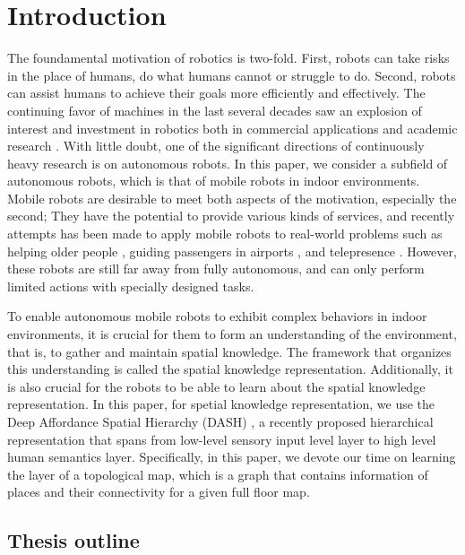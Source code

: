 \documentclass[10pt, titlepage]{article}
\theoremstyle{definition}
\begin{document}
\section{Introduction}
The foundamental motivation of robotics is two-fold. First, robots can take risks in the place of humans, do what humans cannot or struggle to do. Second, robots can assist humans to achieve their goals more efficiently and effectively. The continuing favor of machines in the last several decades saw an explosion of interest and investment in robotics both in commercial applications and academic research \cite{pagliarini2017future}. With little doubt, one of the significant directions of continuously heavy research is on autonomous robots. In this paper, we consider a subfield of autonomous robots, which is that of mobile robots in indoor environments. Mobile robots are desirable to meet both aspects of the motivation, especially the second; They have the potential to provide various kinds of services, and recently attempts has been made to apply mobile robots to real-world problems such as helping older people \cite{jayawardena2010deployment}, guiding passengers in airports \cite{triebel2016spencer}, and telepresence \cite{matsuda2016scalablebody}. However, these robots are still far away from fully autonomous, and can only perform limited actions with specially designed tasks.

To enable autonomous mobile robots to exhibit complex behaviors in indoor environments, it is crucial for them to form an understanding of the environment, that is, to gather and maintain spatial knowledge. The framework that organizes this understanding is called the spatial knowledge representation. Additionally, it is also crucial for the robots to be able to learn about the spatial knowledge representation. In this paper, for spetial knowledge representation, we use the Deep Affordance Spatial Hierarchy (DASH) \cite{pronobis2017deep}, a recently proposed hierarchical representation that spans from low-level sensory input level layer to high level human semantics layer. Specifically, in this paper, we devote our time on learning the layer of a topological map, which is a graph that contains information of places and their connectivity for a given full floor map.




\subsection{Thesis outline}
\end{document}
